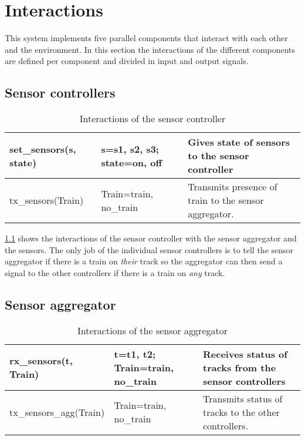 \documentclass[final]{report}
\begin{document}
\chapter{Interactions}
\label{ch:interactions}
This system implements five parallel components that interact with each other and the environment. In this section the interactions of the different components are defined per component and divided in input and output signals.

\section{Sensor controllers}
\begin{table}[H]
\centering
\begin{tabular}{|l|l|l|}
\hline
set\_sensors(s, state) & s=s1, s2, s3; state=on, off & Gives state of sensors to the sensor controller   \\\hline
tx\_sensors(Train) & Train=train, no\_train & Transmits presence of train to the sensor aggregator.  \\\hline
\end{tabular}
\caption{Interactions of the sensor controller}
\label{tb:sensorSignals}
\end{table}

\cref{tb:sensorSignals} shows the interactions of the sensor controller with the sensor aggregator and the sensors. The only job of the individual sensor controllers is to tell the sensor aggregator if there is a train on \textit{their} track so the aggregator can then send a signal to the other controllers if there is a train on \textit{any} track. 

\section{Sensor aggregator}
\begin{table}[H]
\centering
\begin{tabular}{|l|l|l|}
\hline
rx\_sensors(t, Train) & t=t1, t2; Train=train, no\_train & Receives status of tracks from the sensor controllers  \\\hline
tx\_sensors\_agg(Train) & Train=train, no\_train & Transmits status of tracks to the other controllers.  \\\hline
\end{tabular}
\caption{Interactions of the sensor aggregator}
\label{tb:sensorAggSignals}
\end{table}
\end{document}
